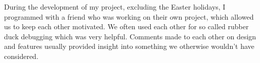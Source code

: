 During the development of my project, excluding the Easter holidays, I programmed with a friend who was working on their own project, which allowed us to keep each other motivated.
We often used each other for so called rubber duck debugging\cite{RUBBER-DUCK-DEBUG} which was very helpful. 
Comments made to each other on design and features usually provided insight into something we otherwise wouldn't have considered.

















